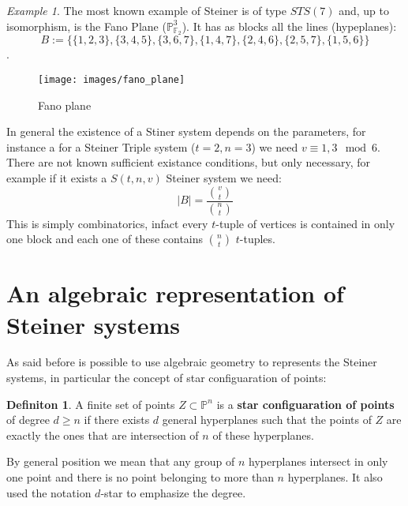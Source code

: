 \documentclass[]{book}
\theoremstyle{plain}
\theoremstyle{remark}
\newtheorem{ex}[rem]{Example}
\theoremstyle{definition}
\newtheorem{deff}[teo]{Definiton}
\newcommand{\PP}{\mathbb{P}}
\begin{document}
\begin{ex}
	The most known example of Steiner is of type $ STS(7) $ and, up to isomorphism, is the Fano Plane ($ \PP_{\mathbb{F}_2}^3 $). It has as blocks all the lines (hypeplanes):
	\[B := \{\{1, 2, 3\}, \{3, 4, 5\}, \{3, 6, 7\}, \{1, 4, 7\}, \{2, 4, 6\}, \{2, 5, 7\}, \{1, 5, 6\}\}\].
\end{ex}

\begin{verbatim*}
%Bho non va
\begin{figure}
\texttt{[image: images/fano\_plane]}
\caption{Fano plane}
\label{fig:fanoplane}
\end{figure}
\end{verbatim*}

In general the existence of a Stiner system depends on the parameters, for instance a for a Steiner Triple system ($ t=2, n=3 $) we need $ v \equiv 1,3 \mod 6 $. There are not known sufficient existance conditions, but only necessary, for example if it exists a $ S(t,n,v) $ Steiner system we need: 
\[
	|B| = \frac{\binom{v}{t}}{\binom{n}{t}}
\]
This is simply combinatorics, infact every $ t $-tuple of vertices is contained in only one block and each one of these contains $ \binom{n}{t} $ $ t $-tuples. 

\section[Ideal of Steyner configuartion]{An algebraic representation of Steiner systems}

As said before is possible to use algebraic geometry to represents the Steiner systems, in particular the concept of star configuaration of points:

\begin{deff} \label{def:starconf}
A finite set of points $ Z \subset \PP^n $ is a \textbf{star configuaration of points} of degree $ d \geq n $ if there exists $ d $ general hyperplanes such that the points of $ Z $ are exactly the ones that are intersection of $ n $ of these hyperplanes.
\end{deff}
By general position we mean that any group of $ n $ hyperplanes intersect in only one point and there is no point belonging to more than $ n $ hyperplanes. It also used the notation $ d $-star to emphasize the degree. 
\end{document}
